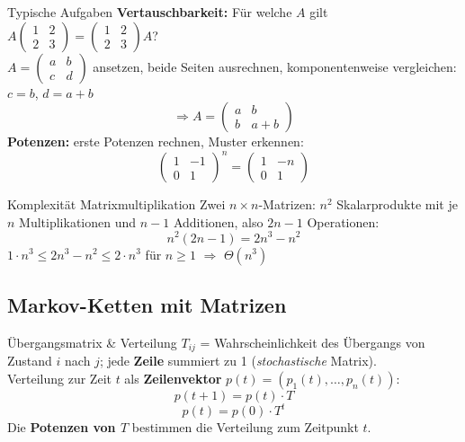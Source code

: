 \documentclass[a4paper, fontsize=7pt]{scrartcl}
\renewcommand*{\arraystretch}{1.5}  %
\begin{document}
\begin{subbox}{Typische Aufgaben}
\renewcommand*{\arraystretch}{1.05}
\textbf{Vertauschbarkeit:} Für welche $A$ gilt
$A \begin{pmatrix} 1 & 2\\ 2 & 3 \end{pmatrix}
= \begin{pmatrix} 1 & 2\\ 2 & 3 \end{pmatrix} A$?\\
$A = \begin{pmatrix} a & b\\ c & d \end{pmatrix}$ ansetzen, beide Seiten
ausrechnen, komponentenweise vergleichen: $c = b$, $d = a + b$
$$\Rightarrow A = \begin{pmatrix} a & b\\ b & a + b \end{pmatrix}$$
\textbf{Potenzen:} erste Potenzen rechnen, Muster erkennen:
$$\begin{pmatrix} 1 & -1\\ 0 & 1 \end{pmatrix}^{\!n}
= \begin{pmatrix} 1 & -n\\ 0 & 1 \end{pmatrix}$$
\end{subbox}

\begin{mainbox}{Komplexität Matrixmultiplikation}
Zwei $n \times n$-Matrizen: $n^2$ Skalarprodukte mit je $n$ Multiplikationen und
$n - 1$ Additionen, also $2n - 1$ Operationen:
$$n^2(2n - 1) = 2n^3 - n^2$$
$1 \cdot n^3 \le 2n^3 - n^2 \le 2 \cdot n^3$ für $n \ge 1$
$\Rightarrow$ $\boxed{\Theta(n^3)}$
\end{mainbox}

\subsection{Markov-Ketten mit Matrizen}

\begin{mainbox}{Übergangsmatrix \& Verteilung}
$T_{ij}$ = Wahrscheinlichkeit des Übergangs von Zustand $i$ nach $j$; jede
\textbf{Zeile} summiert zu 1 (\emph{stochastische} Matrix).\\
Verteilung zur Zeit $t$ als \textbf{Zeilenvektor}
$p(t) = (p_1(t), \ldots, p_n(t))$:
$$p(t + 1) = p(t) \cdot T$$
$$\boxed{p(t) = p(0) \cdot T^t}$$
Die \textbf{Potenzen von $T$} bestimmen die Verteilung zum Zeitpunkt $t$.
\end{mainbox}
\end{document}

